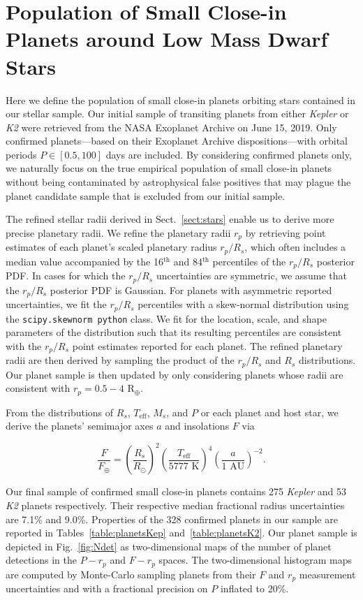 \documentclass[twocolumn]{emulateapj}
\newcommand{\kepler}[1]{\emph{Kepler}#1}
\newcommand{\ktwo}[1]{\emph{K2}#1}
\newcommand{\teff}[1]{$T_{\text{eff}}$#1}
\begin{document}
\section{Population of Small Close-in Planets around Low Mass Dwarf Stars} \label{sect:planets}
Here we define the population of small close-in planets orbiting stars contained in our stellar sample.
Our initial sample of transiting planets from either \kepler{} or \ktwo{} were retrieved from the
NASA Exoplanet Archive \citep{akeson13} on June 15, 2019. Only confirmed
planets---based on their Exoplanet Archive dispositions---with orbital periods
$P\in [0.5,100]$ days are included. By considering confirmed
planets only, we naturally focus on the true empirical population of small close-in planets
without being contaminated by astrophysical false positives that may plague the planet
candidate sample that is excluded from our initial sample.

The refined stellar radii derived in Sect.~\ref{sect:stars} enable us to derive more precise
planetary radii.
We refine the planetary radii $r_p$ by retrieving point estimates of each planet's scaled planetary radius
$r_p/R_s$, which often includes a median value 
accompanied by the 16$^{\text{th}}$ and 84$^{\text{th}}$ percentiles of the $r_p/R_s$ posterior PDF.
In cases for which the $r_p/R_s$ uncertainties
are symmetric, we assume that the $r_p/R_s$ posterior PDF is Gaussian. For planets with asymmetric reported
uncertainties, we fit the $r_p/R_s$ percentiles with a skew-normal distribution using the
\texttt{scipy.skewnorm python} class. We fit for the location, scale, and shape parameters of the
distribution such that its resulting percentiles are consistent with
the $r_p/R_s$ point estimates reported for each planet. The refined planetary radii are then derived by
sampling the product of the $r_p/R_s$ and $R_s$ distributions. Our planet sample is then updated by
only considering planets whose radii are consistent with $r_p = 0.5-4$ R$_{\oplus}$.

From the distributions of $R_s$, \teff{,} $M_s$, and $P$ or each planet and host star, we derive the planets'
semimajor axes $a$ and insolations $F$ via

\begin{equation}
  \frac{F}{F_{\oplus}} = \left( \frac{R_s}{R_{\odot}} \right)^2  \left( \frac{T_{\text{eff}}}{5777 \text{ K}} \right)^4 \left( \frac{a}{1 \text{ AU}} \right)^{-2}.
\end{equation}

Our final sample of confirmed small close-in planets 
contains 275 \kepler{} and 53 \ktwo{} planets respectively. Their respective median fractional
radius uncertainties are 7.1\% and 9.0\%. Properties of the 328 confirmed planets in our sample
are reported in Tables~\ref{table:planetsKep} and~\ref{table:planetsK2}. Our planet sample is
depicted in Fig.~\ref{fig:Ndet} as two-dimensional maps of the number of planet detections in
the $P-r_p$ and $F-r_p$ spaces. The two-dimensional histogram maps are computed by
Monte-Carlo sampling planets from their $F$ and $r_p$
measurement uncertainties and with a fractional precision on $P$ inflated to 20\%.
\end{document}
